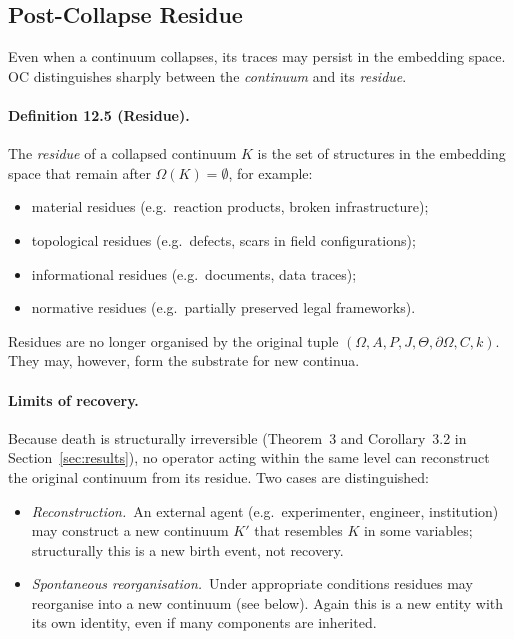 \subsection{Post-Collapse Residue}

Even when a continuum collapses, its traces may persist in the embedding
space. OC distinguishes sharply between the \emph{continuum} and its
\emph{residue}.

\paragraph{Definition 12.5 (Residue).}
The \emph{residue} of a collapsed continuum \(K\) is the set of structures in
the embedding space that remain after \(\Omega(K)=\emptyset\), for example:
\begin{itemize}
  \item material residues (e.g.\ reaction products, broken infrastructure);
  \item topological residues (e.g.\ defects, scars in field configurations);
  \item informational residues (e.g.\ documents, data traces);
  \item normative residues (e.g.\ partially preserved legal frameworks).
\end{itemize}

Residues are no longer organised by the original tuple
\((\Omega,A,P,J,\Theta,\partial\Omega,C,k)\). They may, however, form the
substrate for new continua.

\paragraph{Limits of recovery.}
Because death is structurally irreversible
(Theorem~3 and Corollary~3.2 in Section~\ref{sec:results}), no operator acting
within the same level can reconstruct the original continuum from its
residue. Two cases are distinguished:
\begin{itemize}
  \item \emph{Reconstruction.}\ 
        An external agent (e.g.\ experimenter, engineer, institution) may
        construct a new continuum \(K'\) that resembles \(K\) in some
        variables; structurally this is a new birth event, not recovery.
  \item \emph{Spontaneous reorganisation.}\ 
        Under appropriate conditions residues may reorganise into a new
        continuum (see below). Again this is a new entity with its own
        identity, even if many components are inherited.
\end{itemize}

